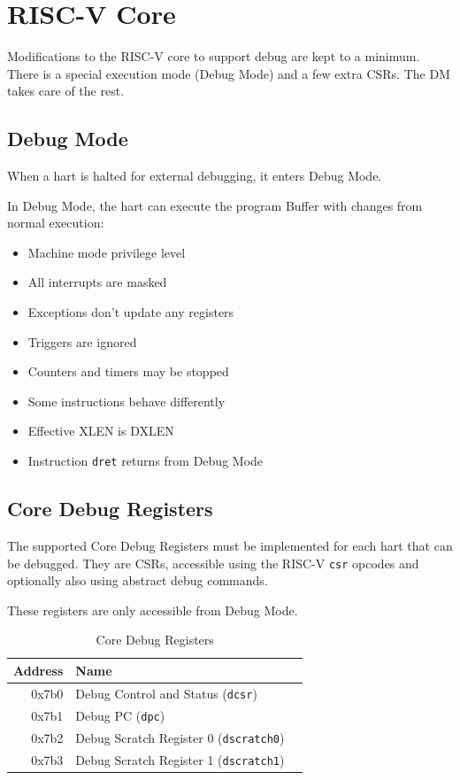 \documentclass{article}
\begin{document}
	\newpage
	\section{RISC-V Core}
	
	Modifications to the RISC-V core to support debug are kept to a minimum. There is a special execution mode (Debug Mode) and a few extra CSRs. The DM takes care of the rest.
	
	\subsection{Debug Mode}
	
	When a hart is halted for external debugging, it enters Debug Mode.
	
	In Debug Mode, the hart can execute the program Buffer with changes from normal execution:
	
	\begin{itemize}
	\item Machine mode privilege level
	\item All interrupts are masked
	\item Exceptions don't update any registers
	\item Triggers are ignored
	\item Counters and timers may be stopped
	\item Some instructions behave differently
	\item Effective XLEN is DXLEN
	\item Instruction {\tt dret} returns from Debug Mode
	\end{itemize}
	
	\subsection{Core Debug Registers}
	
	The supported Core Debug Registers must be implemented for each hart that can be debugged. They are CSRs, accessible using the RISC-V {\tt csr} opcodes and optionally also using abstract debug commands.
	
	These registers are only accessible from Debug Mode.
	
	\begin{table}[H]
   	\begin{center}
      \caption{Core Debug Registers}
      \label{csr}
      	\begin{tabular}{|r|l|l|}
      	\hline
      	Address & Name \\
      	\hline
0x7b0 & Debug Control and Status ({\tt dcsr}) \\
0x7b1 & Debug PC ({\tt dpc}) \\
0x7b2 & Debug Scratch Register 0 ({\tt dscratch0}) \\
0x7b3 & Debug Scratch Register 1 ({\tt dscratch1}) \\
         \hline
      	\end{tabular}
   	\end{center}
	\end{table}
\end{document}
